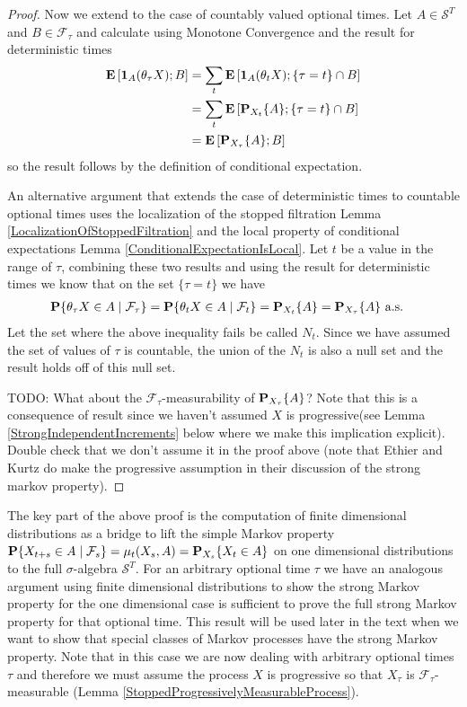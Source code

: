 \begin{proof}
Now we extend to the case of countably valued optional times.  Let $A
\in \mathcal{S}^T$ and $B \in \mathcal{F}_\tau$ and calculate using
Monotone Convergence and the result for deterministic times
\begin{align*}
\expectation{\characteristic{A}(\theta_\tau X) ; B} &= \sum_t
\expectation{\characteristic{A}(\theta_t X) ; \lbrace \tau = t \rbrace
  \cap B} \\
&= \sum_t \expectation{\sprobability{A}{X_t} ; \lbrace \tau = t \rbrace
  \cap B} \\
&= \expectation{\sprobability{A}{X_\tau} ; B} 
\end{align*}
so the result follows by the definition of conditional expectation. 

An alternative argument that extends the case of deterministic times
to countable optional times uses the localization of the stopped
filtration Lemma \ref{LocalizationOfStoppedFiltration} and the local
property of conditional expectations Lemma
\ref{ConditionalExpectationIsLocal}.  Let $t$ be a value in the range
of $\tau$, combining these two results and
using the result for deterministic times we
know that on the set $\lbrace \tau = t \rbrace$ we have
\begin{align*}
\cprobability{\mathcal{F}_{\tau}}{\theta_\tau X \in A} &=
\cprobability{\mathcal{F}_t}{\theta_t X \in A} = \sprobability{A}{X_t}
 = \sprobability{A}{X_\tau} \text{ a.s.}
\end{align*}
Let the set where the above inequality fails be called $N_t$.  Since
we have assumed the set of values of $\tau$ is countable, the union of
the $N_t$ is also a null set and the result holds off of this null
set.

TODO: What about the $\mathcal{F}_\tau$-measurability of
$\sprobability{A}{X_\tau}$?  Note that this is a consequence of result
since we haven't assumed $X$ is progressive(see Lemma
\ref{StrongIndependentIncrements} below where we make this implication explicit).  Double check that we
don't assume it in the proof above (note that Ethier and Kurtz do make the progressive assumption in their
discussion of the strong markov property).
\end{proof}

The key part of the above proof is the computation of finite dimensional distributions as a bridge to
lift the simple Markov property $\cprobability{\mathcal{F}_s}{X_{t+s} \in A} = \mu_{t}(X_s, A) = \sprobability{X_t \in A}{X_s}$ 
on one dimensional distributions to the full $\sigma$-algebra $\mathcal{S}^T$.  For an arbitrary optional time $\tau$ we have an analogous
argument using finite dimensional distributions to show the strong Markov property for the one dimensional case is sufficient to 
prove the full strong Markov property for that optional time.  This result will be used later in the text when we want to show that 
special classes of Markov processes have the strong Markov property.  Note that in this case we are now dealing with arbitrary 
optional times $\tau$ and therefore we must assume the process $X$ is progressive so that $X_\tau$ is $\mathcal{F}_\tau$-measurable 
(Lemma \ref{StoppedProgressivelyMeasurableProcess}).

